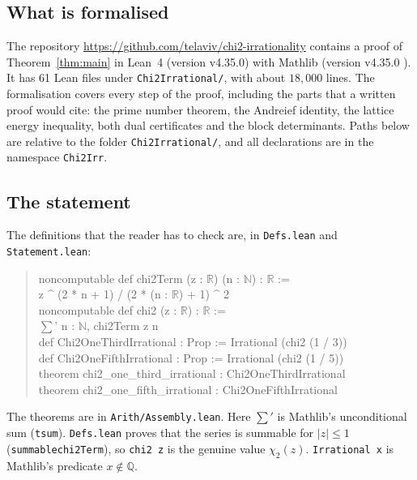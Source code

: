 \documentclass[11pt]{amsart}
\theoremstyle{definition}
\theoremstyle{remark}
\numberwithin{equation}{section}
\newcommand{\QQ}{\mathbb{Q}}
\newcommand{\lean}[1]{{\def\_{\textunderscore\allowbreak}\texttt{#1}}}
\begin{document}
\subsection{What is formalised}
The repository \url{https://github.com/telaviv/chi2-irrationality} \cite{Chi2Repo} contains a proof of
Theorem~\ref{thm:main} in Lean~4 \cite{LeanFour} (version v4.35.0) with Mathlib \cite{Mathlib} (version v4.35.0
\cite{Mathlib4}). It has 61 Lean files under \lean{Chi2Irrational\slash{}}, with about $18{,}000$ lines. The formalisation covers every step of the proof,
including the parts that a written proof would cite: the prime number theorem, the Andreief identity, the lattice
energy inequality, both dual certificates and the block determinants. Paths below are relative to the folder
\lean{Chi2Irrational\slash{}}, and all declarations are in the namespace \lean{Chi2Irr}.

\subsection{The statement}
The definitions that the reader has to check are, in \lean{Defs.lean} and \lean{Statement.lean}:
\begin{quote}\ttfamily\footnotesize
noncomputable def chi2Term (z : $\mathbb{R}$) (n : $\mathbb{N}$) : $\mathbb{R}$ :=\\
\hspace*{2em}z \^{} (2 * n + 1) / (2 * (n : $\mathbb{R}$) + 1) \^{} 2\\[2pt]
noncomputable def chi2 (z : $\mathbb{R}$) : $\mathbb{R}$ :=\\
\hspace*{2em}$\sum$' n : $\mathbb{N}$, chi2Term z n\\[2pt]
def Chi2OneThirdIrrational : Prop := Irrational (chi2 (1 / 3))\\
def Chi2OneFifthIrrational : Prop := Irrational (chi2 (1 / 5))\\[2pt]
theorem chi2\_one\_third\_irrational : Chi2OneThirdIrrational\\
theorem chi2\_one\_fifth\_irrational : Chi2OneFifthIrrational
\end{quote}
The theorems are in \lean{Arith\slash{}Assembly.lean}. Here $\sum'$ is Mathlib's unconditional sum (\lean{tsum}).
\lean{Defs.lean} proves that the series is summable for $|z|\le1$ (\lean{summable\_chi2Term}), so \lean{chi2 z} is the
genuine value $\chi_2(z)$. \lean{Irrational x} is Mathlib's predicate $x\notin\QQ$.
\end{document}
